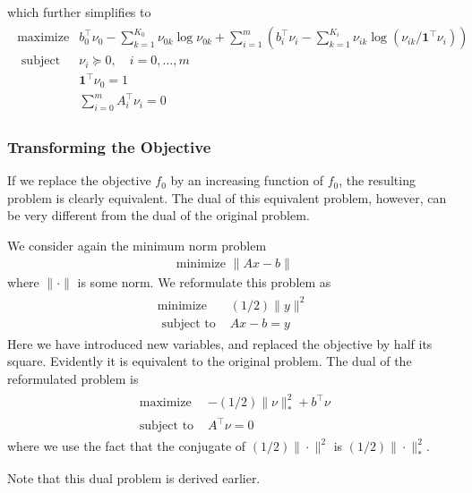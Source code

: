 \documentclass{article}
\begin{document}
\begin{exma}
\begin{align*}
\end{align*}
which further simplifies to
\begin{align*}
\begin{array}{ll}
\operatorname{maximize} & b_{0}^{\top} \nu_{0}-\sum_{k=1}^{K_{0}} \nu_{0 k} \log \nu_{0 k}+\sum_{i=1}^{m}\left(b_{i}^{\top} \nu_{i}-\sum_{k=1}^{K_{i}} \nu_{i k} \log \left(\nu_{i k} / \mathbf{1}^{\top} \nu_{i}\right)\right) \\
\text { subject to } & \nu_{i} \succeq 0, \quad i=0, \ldots, m \\
& \mathbf{1}^{\top} \nu_{0}=1 \\
& \sum_{i=0}^{m} A_{i}^{\top} \nu_{i}=0
\end{array}
\end{align*}
\end{exma}
\subsubsection{Transforming the Objective}
If we replace the objective $f_{0}$ by an increasing function of $f_{0}$, the resulting problem is clearly equivalent. The dual of this equivalent problem, however, can be very different from the dual of the original problem.
\begin{exma}
 We consider again the minimum norm problem
\begin{align*}
\text { minimize }\|A x-b\|
\end{align*}
where $\|\cdot\|$ is some norm. We reformulate this problem as
\begin{align*}
\begin{array}{ll}
\operatorname{minimize} & (1 / 2)\|y\|^{2} \\
\text { subject to } & A x-b=y
\end{array}
\end{align*}
Here we have introduced new variables, and replaced the objective by half its square. Evidently it is equivalent to the original problem.
The dual of the reformulated problem is
\begin{align*}
\begin{array}{ll}
\text { maximize } & -(1 / 2)\|\nu\|_{*}^{2}+b^{\top} \nu \\
\text { subject to } & A^{\top} \nu=0
\end{array}
\end{align*}
where we use the fact that the conjugate of $(1 / 2)\|\cdot\|^{2}$ is $(1 / 2)\|\cdot\|_{*}^{2}$.

Note that this dual problem is  derived earlier.
\end{exma}
\end{document}
